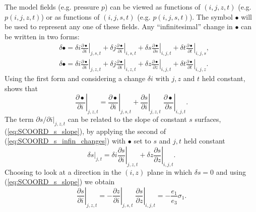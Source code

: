 \documentclass[../main/NEMO_manual]{subfiles}
\begin{document}
The model fields (e.g. pressure $p$) can be viewed as functions of $(i,j,z,t)$ (e.g. $p(i,j,z,t)$) or as
functions of $(i,j,s,t)$ (e.g. $p(i,j,s,t)$). The symbol $\bullet$ will be used to represent any one of
these fields.  Any ``infinitesimal'' change in $\bullet$ can be written in two forms:
\begin{equation}
  \label{eq:SCOORD_s_infin_changes}
  \begin{aligned}
    & \delta \bullet =  \delta i \left. \frac{ \partial \bullet }{\partial i} \right|_{j,s,t}
                + \delta j \left. \frac{ \partial \bullet }{\partial i} \right|_{i,s,t}
                + \delta s \left. \frac{ \partial \bullet }{\partial s} \right|_{i,j,t}
                + \delta t \left. \frac{ \partial \bullet }{\partial t} \right|_{i,j,s} , \\
    & \delta \bullet =  \delta i \left. \frac{ \partial \bullet }{\partial i} \right|_{j,z,t}
                + \delta j \left. \frac{ \partial \bullet }{\partial i} \right|_{i,z,t}
                + \delta z \left. \frac{ \partial \bullet }{\partial z} \right|_{i,j,t}
                + \delta t \left. \frac{ \partial \bullet }{\partial t} \right|_{i,j,z} .
  \end{aligned}
\end{equation}
Using the first form and considering a change $\delta i$ with $j, z$ and $t$ held constant, shows that
\begin{equation}
  \label{eq:SCOORD_s_chain_rule1}
      \left. {\frac{\partial \bullet }{\partial i}} \right|_{j,z,t}  =
      \left. {\frac{\partial \bullet }{\partial i}} \right|_{j,s,t}
    + \left. {\frac{\partial s       }{\partial i}} \right|_{j,z,t} \;
      \left. {\frac{\partial \bullet }{\partial s}} \right|_{i,j,t} .
\end{equation}
The term $\left. \partial s / \partial i \right|_{j,z,t}$ can be related to the slope of constant $s$ surfaces,
(\autoref{eq:SCOORD_s_slope}), by applying the second of (\autoref{eq:SCOORD_s_infin_changes}) with $\bullet$ set to
$s$ and $j, t$ held constant
\begin{equation}
\label{eq:SCOORD_delta_s}
\delta s|_{j,t} =
         \delta i \left. \frac{ \partial s }{\partial i} \right|_{j,z,t}
       + \delta z \left. \frac{ \partial s }{\partial z} \right|_{i,j,t} .
\end{equation}
Choosing to look at a direction in the $(i,z)$ plane in which $\delta s = 0$ and using
(\autoref{eq:SCOORD_s_slope}) we obtain
\begin{equation}
\left. \frac{ \partial s }{\partial i} \right|_{j,z,t} =
         -  \left. \frac{ \partial z }{\partial i} \right|_{j,s,t} \;
            \left. \frac{ \partial s }{\partial z} \right|_{i,j,t}
	 = - \frac{e_1 }{e_3 }\sigma_1  .
\label{eq:SCOORD_ds_di_z}
\end{equation}
\end{document}
